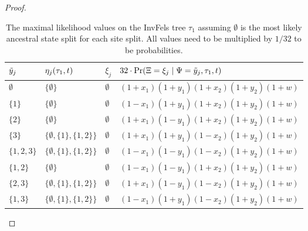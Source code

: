 \begin{proof}
\begin{table}
\centering
\begin{tabular}{|lll|l|}
\hline
$\tilde{y}_j$ & $\eta_j(\tau_1, t)$ & $\xi_j$ & $32\cdot\Pr(\Xi=\xi_j \mid \Psi=\tilde{y}_j,\tau_1,t)$\\
\hline
$\emptyset$&$\{\emptyset\}$&$\emptyset$&$(1+x_1)(1+y_1)(1+x_2)(1+y_2)(1+w)$\\
$\{1\}$    &$\{\emptyset\}$&$\emptyset$&$(1-x_1)(1+y_1)(1+x_2)(1+y_2)(1+w)$\\
$\{2\}$    &$\{\emptyset\}$&$\emptyset$&$(1+x_1)(1-y_1)(1+x_2)(1+y_2)(1+w)$\\
$\{3\}$    &$\{\emptyset,\{1\},\{1,2\}\}$&$\emptyset$&$(1+x_1)(1+y_1)(1-x_2)(1+y_2)(1+w)$\\
$\{1,2,3\}$&$\{\emptyset,\{1\},\{1,2\}\}$&$\emptyset$&$(1-x_1)(1-y_1)(1-x_2)(1+y_2)(1+w)$\\
$\{1,2\}$  &$\{\emptyset\}$&$\emptyset$&$(1-x_1)(1-y_1)(1+x_2)(1+y_2)(1+w)$\\
$\{2,3\}$  &$\{\emptyset,\{1\},\{1,2\}\}$&$\emptyset$&$(1+x_1)(1-y_1)(1-x_2)(1+y_2)(1+w)$\\
$\{1,3\}$  &$\{\emptyset,\{1\},\{1,2\}\}$&$\emptyset$&$(1-x_1)(1+y_1)(1-x_2)(1+y_2)(1+w)$\\
\hline
\end{tabular}
\caption{
The maximal likelihood values on the InvFels tree $\tau_1$ assuming $\emptyset$ is the most likely ancestral state split for each site split.
All values need to be multiplied by $1/32$ to be probabilities.}
\label{tab:likelihoods-restricted}
\end{table}


\end{proof}
